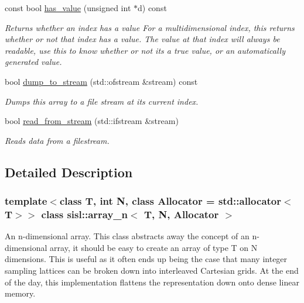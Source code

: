 \begin{DoxyCompactItemize}
\mbox{\label{classsisl_1_1array__n_a54507c52f966f7a923a64cb509a09b56}} 
const bool \hyperlink{classsisl_1_1array__n_a54507c52f966f7a923a64cb509a09b56}{has\+\_\+value} (unsigned int $\ast$d) const
\begin{DoxyCompactList}\small\item\em Returns whether an index has a value For a multidimensional index, this returns whether or not that index has a value. The value at that index will always be readable, use this to know whether or not it\textquotesingle{}s a true value, or an automatically generated value. \end{DoxyCompactList}\item 
\mbox{\label{classsisl_1_1array__n_a45cb0c98a773ce6e2c4a1315c1cc0a87}} 
bool \hyperlink{classsisl_1_1array__n_a45cb0c98a773ce6e2c4a1315c1cc0a87}{dump\+\_\+to\+\_\+stream} (std\+::ofstream \&stream) const
\begin{DoxyCompactList}\small\item\em Dumps this array to a file stream at its current index. \end{DoxyCompactList}\item 
\mbox{\label{classsisl_1_1array__n_abf5a844143174cd0b56d04e82893672d}} 
bool \hyperlink{classsisl_1_1array__n_abf5a844143174cd0b56d04e82893672d}{read\+\_\+from\+\_\+stream} (std\+::ifstream \&stream)
\begin{DoxyCompactList}\small\item\em Reads data from a filestream. \end{DoxyCompactList}\end{DoxyCompactItemize}


\subsection{Detailed Description}
\subsubsection*{template$<$class T, int N, class Allocator = std\+::allocator$<$\+T$>$$>$\newline
class sisl\+::array\+\_\+n$<$ T, N, Allocator $>$}

An n-\/dimensional array. This class abstracts away the concept of an n-\/dimensional array, it should be easy to create an array of type T on N dimensions. This is useful as it often ends up being the case that many integer sampling lattices can be broken down into interleaved Cartesian grids. At the end of the day, this implementation flattens the representation down onto dense linear memory. 

